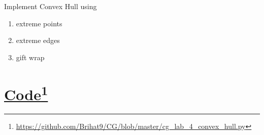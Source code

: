 \documentclass[a4paper,12pt]{article}
\begin{document}
  


  \begin{spacing}{1}
    \hfill \break
    Implement Convex Hull using
    \begin{enumerate}[leftmargin=*]
      \itemsep0em
      \item extreme points
      \item extreme edges
      \item gift wrap
    \end{enumerate}
  \end{spacing}

  \section*{\textbf{\underline{Code}}\footnote{\url{https://github.com/Brihat9/CG/blob/master/cg_lab_4_convex_hull.py}}}
\end{document}
